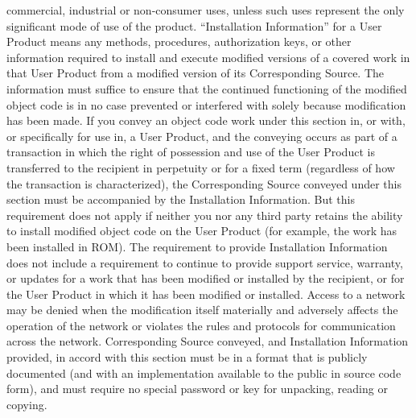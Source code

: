 \documentclass {scrbook}
\begin{document}
\begin{tiny}
commercial, industrial or non-consumer uses, unless such uses represent the only significant mode of use of the product. ``Installation Information'' for a User Product means any methods, procedures, authorization keys, or other information required to install and execute modified versions of a covered work in that User Product from a modified version of its Corresponding Source. The information must suffice to ensure that the continued functioning of the modified object code is in no case prevented or interfered with solely because modification has been made. If you convey an object code work under this section in, or with, or specifically for use in, a User Product, and the conveying occurs as part of a transaction in which the right of possession and use of the User Product is transferred to the recipient in perpetuity or for a fixed term (regardless of how the transaction is characterized), the Corresponding Source conveyed under this section must be accompanied by the Installation Information. But this requirement does not apply if neither you nor any third party retains the ability to install modified object code on the User Product (for example, the work has been installed in ROM). The requirement to provide Installation Information does not include a requirement to continue to provide support service, warranty, or updates for a work that has been modified or installed by the recipient, or for the User Product in which it has been modified or installed. Access to a network may be denied when the modification itself materially and adversely affects the operation of the network or violates the rules and protocols for communication across the network. Corresponding Source conveyed, and Installation Information provided, in accord with this section must be in a format that is publicly documented (and with an implementation available to the public in source code form), and must require no special password or key for unpacking, reading or copying.


\end{tiny}
\end{document}
